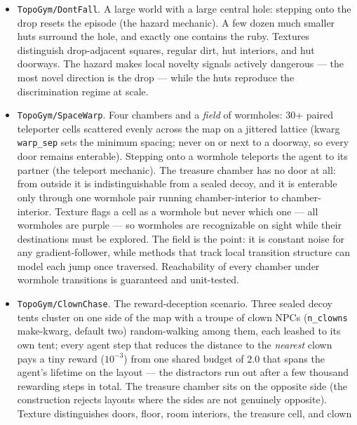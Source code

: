 \documentclass[11pt]{article}
\begin{document}
\begin{itemize}[leftmargin=2em, itemsep=3pt]
        the ordering constraint (which door must come first) remains
        global.
  \item \texttt{TopoGym/DontFall}. A large world with a large
        central hole: stepping onto the drop resets the episode (the
        hazard mechanic). A few dozen much smaller huts surround the
        hole, and exactly one contains the ruby. Textures
        distinguish drop-adjacent squares, regular dirt, hut
        interiors, and hut doorways. The hazard makes local novelty
        signals actively dangerous --- the most novel direction is
        the drop --- while the huts reproduce the discrimination
        regime at scale.
  \item \texttt{TopoGym/SpaceWarp}. Four chambers and a \emph{field}
        of wormholes: 30+ paired teleporter cells scattered evenly
        across the map on a jittered lattice (kwarg
        \texttt{warp\_sep} sets the minimum spacing; never on or next
        to a doorway, so every door remains enterable). Stepping onto
        a wormhole teleports the agent to its partner (the teleport
        mechanic). The treasure chamber has no door at all: from
        outside it is indistinguishable from a sealed decoy, and it
        is enterable only through one wormhole pair running
        chamber-interior to chamber-interior. Texture flags a cell as
        a wormhole but never which one --- all wormholes are purple
        --- so wormholes are recognizable on sight while their
        destinations must be explored. The field is the point: it is
        constant noise for any gradient-follower, while methods that
        track local transition structure can model each jump once
        traversed. Reachability of every chamber under wormhole
        transitions is guaranteed and unit-tested.
  \item \texttt{TopoGym/ClownChase}. The reward-deception scenario.
        Three sealed decoy tents cluster on one side of the map with
        a troupe of clown NPCs (\texttt{n\_clowns} make-kwarg,
        default two) random-walking among them, each leashed to its
        own tent; every agent step that reduces the distance to the
        \emph{nearest} clown pays a tiny reward ($10^{-3}$) from one
        shared budget of $2.0$ that spans the agent's lifetime on the
        layout --- the distractors run out after a few thousand
        rewarding steps in total. The treasure chamber sits on the
        opposite side (the construction rejects layouts where the
        sides are not genuinely opposite). Texture distinguishes
        doors, floor, room interiors, the treasure cell, and clown

\end{itemize}
\end{document}
